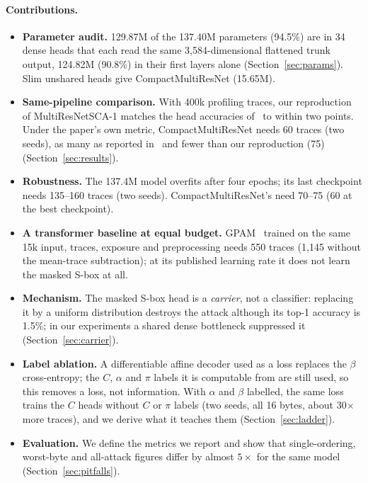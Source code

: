 \paragraph{Contributions.}
\begin{itemize}
  \item \textbf{Parameter audit.} 129.87M of the 137.40M parameters (94.5\%) are in 34 dense heads that
    each read the same 3,584-dimensional flattened trunk output, 124.82M (90.8\%) in their first layers alone
    (Section~\ref{sec:params}). Slim unshared heads give CompactMultiResNet (15.65M).
  \item \textbf{Same-pipeline comparison.} With 400k profiling traces, our reproduction of
    MultiResNetSCA-1 matches the head accuracies of~\cite{MS23} to within two points. Under the
    paper's own metric, CompactMultiResNet needs 60 traces (two seeds), as many as reported
    in~\cite{MS23} and fewer than our reproduction (75) (Section~\ref{sec:results}).
  \item \textbf{Robustness.} The 137.4M model overfits after four epochs; its last checkpoint needs
    135--160 traces (two seeds). CompactMultiResNet's need 70--75 (60 at the best checkpoint).
  \item \textbf{A transformer baseline at equal budget.} GPAM~\cite{GPAM} trained on the same 15k
    input, traces, exposure and preprocessing needs 550 traces (1,145 without the mean-trace
    subtraction); at its published learning rate it does not learn the masked S-box at all.
  \item \textbf{Mechanism.} The masked S-box head is a \emph{carrier}, not a classifier: replacing it
    by a uniform distribution destroys the attack although its top-1 accuracy is 1.5\%; in our experiments
    a shared dense bottleneck suppressed it (Section~\ref{sec:carrier}).
  \item \textbf{Label ablation.} A differentiable affine decoder used as a loss replaces the
    $\beta$ cross-entropy; the $C$, $\alpha$ and $\pi$ labels it is computable from are
    still used, so this removes a loss, not information. With $\alpha$ and $\beta$ labelled, the same loss
    trains the $C$ heads without $C$ or $\pi$ labels (two seeds, all 16 bytes, about 30$\times$ more
    traces), and we derive what it teaches them (Section~\ref{sec:ladder}).
  \item \textbf{Evaluation.} We define the metrics we report and show that single-ordering,
    worst-byte and all-attack figures differ by almost $5\times$ for the same model
    (Section~\ref{sec:pitfalls}).
\end{itemize}

